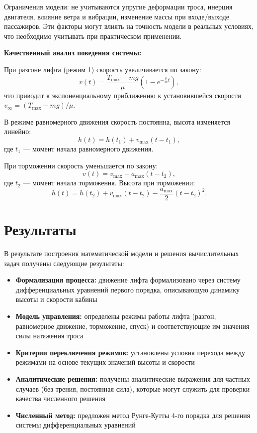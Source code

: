 \documentclass[a4paper, 14pt]{extarticle}
\begin{document}
Ограничения модели: не учитываются упругие деформации троса, инерция двигателя, влияние ветра и вибрации, изменение массы при входе/выходе пассажиров. Эти факторы могут влиять на точность модели в реальных условиях, что необходимо учитывать при практическом применении.

\textbf{Качественный анализ поведения системы:}

При разгоне лифта (режим 1) скорость увеличивается по закону:
\[
v(t) = \frac{T_{\max} - mg}{\mu}\left(1 - e^{-\frac{\mu}{m}t}\right),
\]
что приводит к экспоненциальному приближению к установившейся скорости $v_{\infty} = (T_{\max} - mg)/\mu$.

В режиме равномерного движения скорость постоянна, высота изменяется линейно:
\[
h(t) = h(t_1) + v_{\max}(t - t_1),
\]
где $t_1$ --- момент начала равномерного движения.

При торможении скорость уменьшается по закону:
\[
v(t) = v_{\max} - a_{\max}(t - t_2),
\]
где $t_2$ --- момент начала торможения. Высота при торможении:
\[
h(t) = h(t_2) + v_{\max}(t - t_2) - \frac{a_{\max}}{2}(t - t_2)^2.
\]

\section{Результаты}
В результате построения математической модели и решения вычислительных задач получены следующие результаты:

\begin{itemize}
  \item \textbf{Формализация процесса:} движение лифта формализовано через систему дифференциальных уравнений первого порядка, описывающую динамику высоты и скорости кабины
  \item \textbf{Модель управления:} определены режимы работы лифта (разгон, равномерное движение, торможение, спуск) и соответствующие им значения силы натяжения троса
  \item \textbf{Критерии переключения режимов:} установлены условия перехода между режимами на основе текущих значений высоты и скорости
  \item \textbf{Аналитические решения:} получены аналитические выражения для частных случаев (без трения, постоянная сила), которые могут служить для проверки качества численного решения
  \item \textbf{Численный метод:} предложен метод Рунге-Кутты 4-го порядка для решения системы дифференциальных уравнений
\end{itemize}
\end{document}
